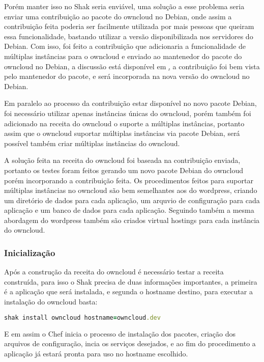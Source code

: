 Porém manter isso no Shak seria enviável, uma solução a esse problema seria enviar
uma contribuição ao pacote do owncloud no Debian, onde assim a contribuição feita
poderia ser facilmente utilizada por mais pessoas que queiram essa funcionalidade,
bastando utilizar a versão disponibilizada nos servidores do Debian. Com isso, foi
feito a contribuição que adicionaria a funcionalidade de múltiplas instâncias para
o owncloud e enviado ao mantenedor do pacote do owncloud no Debian,
a discussão está disponível em \href{https://bugs.debian.org/cgi-bin/bugreport.cgi?bug=789726},
a contribuição foi bem vista pelo mantenedor do pacote, e será incorporada na nova
versão do owncloud no Debian.

Em paralelo ao processo da contribuição estar disponível no novo pacote Debian,
foi necessário utilizar apenas instâncias únicas do owncloud, porém também foi
adicionado na receita do owncloud o suporte a múltiplas instâncias, portanto
assim que o owncloud suportar múltiplas instâncias via pacote Debian, será possível
também criar múltiplas instâncias do owncloud.

A solução feita na receita do owncloud foi baseada na contribuição enviada, portanto
os testes foram feitos gerando um novo pacote Debian do owncloud porém incorporando
a contribuição feita. Os procedimentos feitos para suportar múltiplas instâncias
no owncloud são bem semelhantes aos do wordpress, criando um diretório de dados
para cada aplicação, um arquvio de configuração para cada aplicação e um banco de
dados para cada aplicação. Seguindo também a mesma abordagem do wordpress também
são criados virtual hostings para cada instância do owncloud.

\subsubsection{Inicialização}

Após a construção da receita do owncloud é necessário testar a receita construída,
para isso o Shak precisa de duas informações importantes, a primeira é a aplicação
que será instalada, e segunda o hostname destino, para executar a instalação
do owncloud basta:

\begin{lstlisting}[language=Ruby,label=dice_index,caption={Exemplo de execução de instalação do owncloud com shak}]
shak install owncloud hostname=owncloud.dev
\end{lstlisting}

E em assim o Chef inicia o processo de instalação dos pacotes, criação dos arquivos
de configuração, incia os serviços desejados, e ao fim do procedimento a aplicação
já estará pronta para uso no hostname escolhido.


